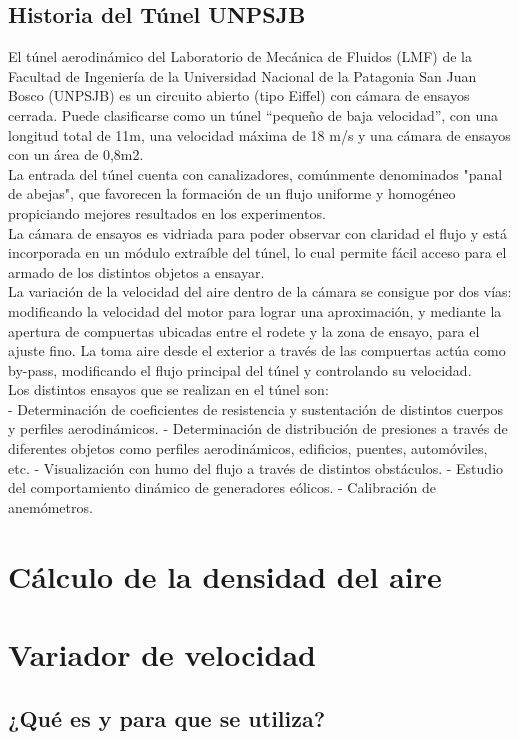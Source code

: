 \documentclass[12pt,a4paper]{article}
\begin{document}
	\subsection{Historia del Túnel UNPSJB}
	\cite{TunelUNPSJB} El túnel aerodinámico del Laboratorio de Mecánica de Fluidos (LMF) de la Facultad de Ingeniería de la Universidad Nacional de la Patagonia San Juan Bosco (UNPSJB) es un circuito abierto (tipo Eiffel) con cámara de ensayos cerrada. Puede clasificarse como un túnel “pequeño de baja velocidad”, con una longitud total de 11m, una velocidad máxima de 18 m/s y una cámara de ensayos con un área de 0,8m2.
	\\
	La entrada del túnel cuenta con canalizadores, comúnmente denominados "panal de abejas", que favorecen la formación de un flujo uniforme y homogéneo propiciando mejores resultados en los experimentos.
	\\
	La cámara de ensayos es vidriada para poder observar con claridad el flujo y está incorporada en un módulo extraíble del túnel, lo cual permite fácil acceso para el armado de los distintos objetos a ensayar.
	\\
	La variación de la velocidad del aire dentro de la cámara se consigue por dos vías: modificando la velocidad del motor para lograr una aproximación, y mediante la apertura de compuertas ubicadas entre el rodete y la zona de ensayo, para el ajuste fino. La toma aire desde el exterior a través de las compuertas actúa como by-pass, modificando el flujo principal del túnel y controlando su velocidad.
	\\
	Los distintos ensayos que se realizan en el túnel son:
	\\
	- Determinación de coeficientes de resistencia y sustentación de distintos cuerpos y perfiles aerodinámicos.
	- Determinación de distribución de presiones a través de diferentes objetos como perfiles aerodinámicos, edificios, puentes, automóviles, etc.
	- Visualización con humo del flujo a través de distintos obstáculos.
	- Estudio del comportamiento dinámico de generadores eólicos.
	- Calibración de anemómetros. 
	\section{Cálculo de la densidad del aire}
	\section{Variador de velocidad}
	\subsection{¿Qué es y para que se utiliza?}
\end{document}
